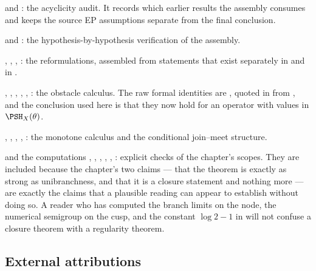  and : the
acyclicity audit.  It records which earlier results the assembly consumes and keeps the
source EP assumptions separate from the final conclusion.

 and : the
hypothesis-by-hypothesis verification of the assembly.

, ,
,
: the reformulations, assembled from
statements that exist separately in \cite{BJ22} and in
.

,
,
,
,
,
: the obstacle calculus.  The
raw formal identities are , quoted in
 from \cite[\S5.3]{BJ22}, and the
conclusion used here is
that they now hold for an operator with values in $\PSH_X(\theta)$.

,
,
,
,
: the monotone calculus and the conditional join--meet
structure.

 and the computations
,
,
,
,
,
: explicit checks of the chapter's scopes.  They are included because the
chapter's two claims --- that the theorem is exactly as strong as
unibranchness, and that it is a closure statement and nothing more --- are
exactly the claims that a plausible reading can appear to establish without
doing so.  A reader who has computed the branch limits on the node, the
numerical semigroup on the cusp, and the constant $\log2-1$ in
 will not confuse a closure theorem with a
regularity theorem.

\subsection{External attributions}
\label{sec:ch45-external}

